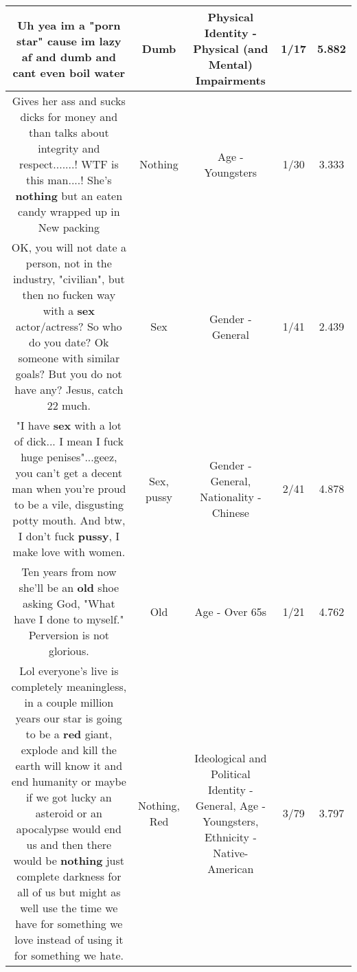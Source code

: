 \documentclass[11pt]{article}
\newlength\mylength
\begin{document}
\begin{center}
\begin{longtable}{|C{.65\mylength}|C{.30\mylength}|C{.12\mylength}|C{.12\mylength}|C{.12\mylength}|}
  \small Uh yea im a "porn star" cause im lazy af and \textbf{dumb} and cant even boil water\normalsize   & Dumb & Physical Identity - Physical (and Mental) Impairments & 1/17 & 5.882 \\  \hline
  \small Gives her ass and sucks dicks for money and than talks about integrity and respect.......! WTF is this man....! She's \textbf{nothing} but an eaten candy wrapped up in New packing\normalsize   & Nothing & Age - Youngsters & 1/30 & 3.333 \\  \hline
  \small OK, you will not date a person, not in the industry, "civilian", but then no fucken way with a \textbf{sex} actor/actress? So who do you date? Ok someone with similar goals? But you do not have any? Jesus, catch 22 much.\normalsize   & Sex & Gender - General & 1/41 & 2.439 \\  \hline
  \small "I have \textbf{sex} with a lot of dick... I mean I fuck huge penises"...geez, you can't get a decent man when you're proud to be a vile, disgusting potty mouth. And btw, I don't fuck \textbf{pussy}, I make love with women.\normalsize   & Sex, pussy & Gender - General, Nationality - Chinese & 2/41 & 4.878 \\  \hline
  \small Ten years from now she'll be an \textbf{old} shoe asking God, "What have I done to myself." Perversion is not glorious.\normalsize   & Old & Age - Over 65s & 1/21 & 4.762 \\  \hline
  \small Lol everyone's live is completely meaningless, in a couple million years our star is going to be a \textbf{r\textbf{ed}} giant, explode and kill the earth will know it and end humanity or maybe if we got lucky an asteroid or an apocalypse would end us and then there would be \textbf{nothing} just complete darkness for all of us but might as well use the time we have for something we love instead of using it for something we hate.\normalsize   & Nothing, Red &  Ideological and Political Identity - General, Age - Youngsters, Ethnicity - Native-American & 3/79 & 3.797 \\  \hline

\end{longtable}
\end{center}
\end{document}
